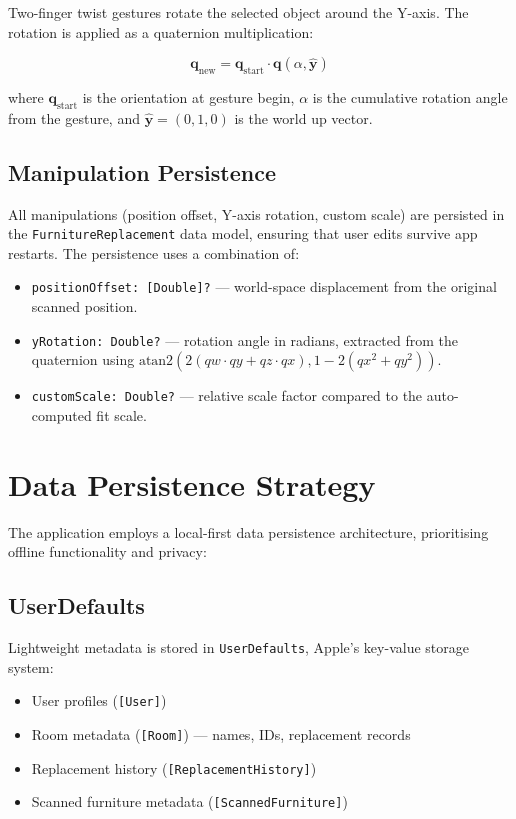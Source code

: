 Two-finger twist gestures rotate the selected object around the Y-axis. The rotation is applied as a quaternion multiplication:

\[
    \mathbf{q}_{\text{new}} = \mathbf{q}_{\text{start}} \cdot \mathbf{q}(\alpha, \hat{\mathbf{y}})
\]

where $\mathbf{q}_{\text{start}}$ is the orientation at gesture begin, $\alpha$ is the cumulative rotation angle from the gesture, and $\hat{\mathbf{y}} = (0, 1, 0)$ is the world up vector.

\subsection{Manipulation Persistence}

All manipulations (position offset, Y-axis rotation, custom scale) are persisted in the \texttt{FurnitureReplacement} data model, ensuring that user edits survive app restarts. The persistence uses a combination of:

\begin{itemize}
    \item \texttt{positionOffset: [Double]?} — world-space displacement from the original scanned position.
    \item \texttt{yRotation: Double?} — rotation angle in radians, extracted from the quaternion using $\text{atan2}(2(qw \cdot qy + qz \cdot qx), 1 - 2(qx^2 + qy^2))$.
    \item \texttt{customScale: Double?} — relative scale factor compared to the auto-computed fit scale.
\end{itemize}


\section{Data Persistence Strategy}
\label{sec:persistence}

The application employs a local-first data persistence architecture, prioritising offline functionality and privacy:

\subsection{UserDefaults}

Lightweight metadata is stored in \texttt{UserDefaults}, Apple's key-value storage system:

\begin{itemize}
    \item User profiles (\texttt{[User]})
    \item Room metadata (\texttt{[Room]}) — names, IDs, replacement records
    \item Replacement history (\texttt{[ReplacementHistory]})
    \item Scanned furniture metadata (\texttt{[ScannedFurniture]})
\end{itemize}

